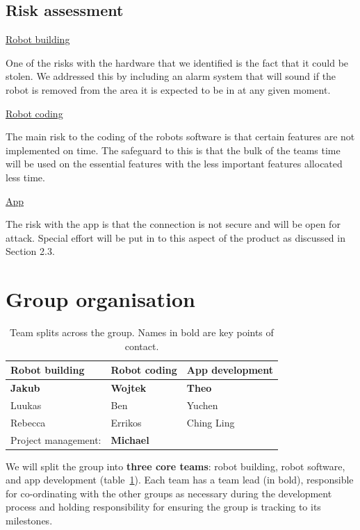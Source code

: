 \documentclass{article}
\begin{document}
\subsection{Risk assessment} 

\underline{Robot building}

One of the risks with the hardware that we identified is the fact that it could be stolen. We addressed this by including an alarm system that will sound if the robot is removed from the area it is expected to be in at any given moment.

\underline{Robot coding}

The main risk to the coding of the robots software is that certain features are not implemented on time. The safeguard to this is that the bulk of the teams time will be used on the essential features with the less important features allocated less time.

\underline{App}

The risk with the app is that the connection is not secure and will be open for attack. Special effort will be put in to this aspect of the product as discussed in Section 2.3.

\section{Group organisation}
\begin{table}[]
  \begin{tabular}{lll}
    \hline
    Robot building & Robot coding & App development   \\
    \hline
    {\bf Jakub}          & {\bf Wojtek}       & {\bf Theo}              \\
    Luukas         & Ben          & Yuchen            \\
    Rebecca        & Errikos      & Ching Ling \\
    \hline
    Project management: & {\bf Michael} & \\
  \end{tabular}
  \caption{Team splits across the group. Names in bold are key points of contact.}
  \label{tab:group-split}
\end{table}

We will split the group into {\bf three core teams}: robot building, robot software, and app development (table~\ref{tab:group-split}). Each team has a team lead (in bold), responsible for co-ordinating with the other groups as necessary during the development process and holding responsibility for ensuring the group is tracking to its milestones.
\end{document}
